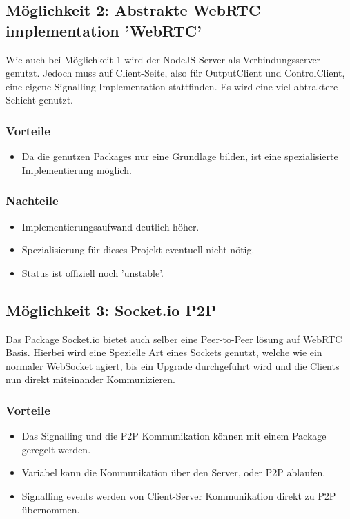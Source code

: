 \subsection{Möglichkeit 2: Abstrakte WebRTC implementation 'WebRTC'}
Wie auch bei Möglichkeit 1 wird der NodeJS-Server als Verbindungsserver genutzt. Jedoch muss auf Client-Seite, also für OutputClient und ControlClient, eine eigene Signalling Implementation stattfinden. Es wird eine viel abtraktere Schicht genutzt.


\subsubsection{Vorteile}
\begin{itemize}
\item
Da die genutzen Packages nur eine Grundlage bilden, ist eine spezialisierte Implementierung möglich.
\end{itemize}

\subsubsection{Nachteile}
\begin{itemize}
\item
Implementierungsaufwand deutlich höher.

\item
Spezialisierung für dieses Projekt eventuell nicht nötig.

\item
Status ist offiziell noch 'unstable'.
\end{itemize}

\subsection{Möglichkeit 3: Socket.io P2P}
Das Package Socket.io bietet auch selber eine Peer-to-Peer lösung auf WebRTC Basis. Hierbei wird eine Spezielle Art eines Sockets genutzt, welche wie ein normaler WebSocket agiert, bis ein Upgrade durchgeführt wird und die Clients nun direkt miteinander Kommunizieren.


\subsubsection{Vorteile}
\begin{itemize}
\item
Das Signalling und die P2P Kommunikation können mit einem Package geregelt werden.

\item
Variabel kann die Kommunikation über den Server, oder P2P ablaufen.

\item
Signalling events werden von Client-Server Kommunikation direkt zu P2P übernommen.
\end{itemize}

